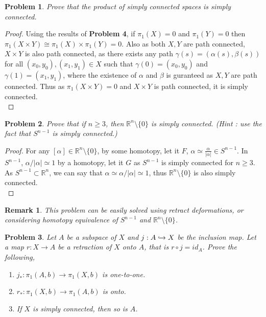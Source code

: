 \documentclass[paper=a4, fontsize=11pt]{scrartcl}
\newtheorem*{remark}{Remark}
\newtheorem{problem}{Problem}
\begin{document}
\begin{problem}
	Prove that the product of simply connected spaces is simply connected.\\
\end{problem}



\begin{proof}
	Using the results of \textbf{Problem 4}, if $\pi_1(X) = 0$ and $\pi_1(Y) = 0$ then $\pi_1(X \times Y) \cong \pi_1(X) \times \pi_1(Y) = 0$. Also as both $X,Y$ are path connected, $X\times Y$ is also path connected, as there exists any path $\gamma(s)=(\alpha(s),\beta(s))$ for all $(x_0,y_0),(x_1,y_1)\in X$ such that $\gamma(0)=(x_0,y_0)$ and $\gamma(1)=(x_1,y_1)$, where the existence of $\alpha$ and $\beta$ is guranteed as $X,Y$ are path connected. Thus as $\pi_1(X\times Y) = 0$ and $X \times Y$ is path connected, it is simply connected.\\
\end{proof}

\begin{problem}
	Prove that if $n \geq 3$, then $\mathbb{R}^n \setminus \{0\}$ is simply connected. (Hint : use the fact that $S^{n-1}$ is simply connected.)\\
\end{problem}

\begin{proof}
	For any $[\alpha] \in \mathbb{R}^n \setminus \{0\}$, by some homotopy, let it $F$, $\alpha \simeq \frac{\alpha}{|\alpha|}\in S^{n-1}$. In $S^{n-1}$, $ \alpha/|\alpha| \simeq 1$ by a homotopy, let it $G$ as $S^{n-1}$ is simply connected for $n\geq 3$. As $S^{n-1} \subset \mathbb{R}^n$, we can say that $\alpha \simeq \alpha/|\alpha| \simeq 1$, thus $\mathbb{R}^n \setminus \{0\}$ is also simply connected. \\
\end{proof}

\begin{remark}
	This problem can be easily solved using retract deformations, or considering homotopy equivalence of $S^{n-1}$ and $\mathbb{R}^n \setminus \{0\}$. \\
\end{remark}

\begin{problem}
	Let $A$ be a subspace of $X$ and $j:A\xhookrightarrow{}X$ be the inclusion map. Let a map $r:X\to A$ be a retraction of $X$ onto  $A$, that is $r \circ j = id_A$. Prove the following,\\
	\begin{enumerate}[label=(\alph*)]
		\item $j_*:\pi_1(A,b)\to \pi_1(X,b)$ is one-to-one.		
		\item $r_*:\pi_1(X,b)\to \pi_1(A,b)$ is onto.
		\item If $X$ is simply connected, then so is $A$.\\
	\end{enumerate}
\end{problem}
\end{document}
